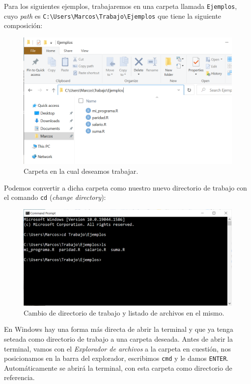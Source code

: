 \documentclass[
]{book}
\begin{document}
Para los siguientes ejemplos, trabajaremos en una carpeta llamada \texttt{Ejemplos}, cuyo \emph{path} es \texttt{C:\textbackslash{}Users\textbackslash{}Marcos\textbackslash{}Trabajo\textbackslash{}Ejemplos} que tiene la siguiente composición:

\begin{figure}

{\centering \includegraphics[width=0.8\linewidth]{images/07_otros/terminal4} 

}

\caption{Carpeta en la cual deseamos trabajar.}\label{fig:unnamed-chunk-172}
\end{figure}

Podemos convertir a dicha carpeta como nuestro nuevo directorio de trabajo con el comando \texttt{cd} (\emph{change directory}):

\begin{figure}

{\centering \includegraphics[width=0.8\linewidth]{images/07_otros/terminal5} 

}

\caption{Cambio de directorio de trabajo y listado de archivos en el mismo.}\label{fig:unnamed-chunk-173}
\end{figure}

En Windows hay una forma más directa de abrir la terminal y que ya tenga seteada como directorio de trabajo a una carpeta deseada. Antes de abrir la terminal, vamos con el \emph{Explorador de archivos} a la carpeta en cuestión, nos posicionamos en la barra del explorador, escribimos \texttt{cmd} y le damos \texttt{ENTER}. Automáticamente se abrirá la terminal, con esta carpeta como directorio de referencia.
\end{document}
